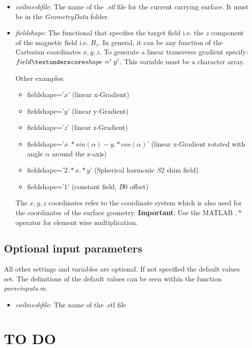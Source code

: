 \documentclass[a4paper,12pt]{book}
\begin{document}
\begin{itemize}
\item  \textit{coil\textunderscore mesh\textunderscore file}: The name of the \textit{.stl} file for the current carrying surface.  It must be in the\textit{ Geometry\textunderscore Data} folder.
\item  \textit{field\textunderscore shape}: The functional that specifies the target field i.e. the \textit{z} component of the magnetic field i.e. $B_{z}$. In general, it can be any function of the Cartesian coordinates $x,y,z$. To generate a linear transverse gradient specify: $field\textunderscore shape='y'$. This variable must be a character array. 

Other examples: 
\begin{itemize}
	\item  field\textunderscore shape='$x$' (linear x-Gradient)
	\item  field\textunderscore shape='$y$' (linear y-Gradient)
	\item  field\textunderscore shape='$z$' (linear z-Gradient)
	\item  field\textunderscore shape='$x.*sin(\alpha)-y.*cos(\alpha)$' (linear x-Gradient rotated with angle $\alpha$ around the z-axis)
	\item  field\textunderscore shape='$2.*x.*y$' (Spherical harmonic $S2$ shim field)
	\item  field\textunderscore shape='$1$' (constant field,  $B0$ offset)
\end{itemize}

The $x,y,z$ coordinates refer to the coordinate system which is also used for the coordinates of the surface geometry.
\textbf{Important}: Use the MATLAB $.*$ operator for element wise multiplication.

\end{itemize}

\subsection{Optional input parameters}

All other settings and variables are optional. If not specified the default values set. The definitions of the default values can be seen within the function \textit{parse\textunderscore inputs.m}.


\begin{itemize}
	\item  \textit{coil\textunderscore mesh\textunderscore file}: The name of the .stl file 
\end{itemize}


\section{TO DO}
\end{document}
